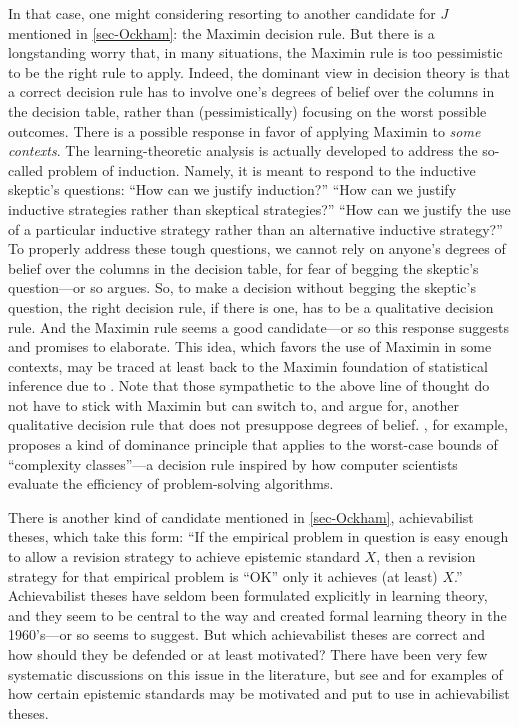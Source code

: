 In that case, one might considering resorting to another candidate for $J$ mentioned in \autoref{sec-Ockham}: the Maximin decision rule. But there is a longstanding worry that, in many situations, the Maximin rule is too pessimistic to be the right rule to apply. Indeed, the dominant view in decision theory is that a correct decision rule has to involve one's degrees of belief over the columns in the decision table, rather than (pessimistically) focusing on the worst possible outcomes. There is a possible response in favor of applying Maximin to {\em some contexts}. The learning-theoretic analysis is actually developed to address the so-called problem of induction. Namely, it is meant to respond to the inductive skeptic's questions: ``How can we justify induction?'' ``How can we justify inductive strategies rather than skeptical strategies?'' ``How can we justify the use of a particular inductive strategy rather than an alternative inductive strategy?'' To properly address these tough questions, we cannot rely on anyone's degrees of belief over the columns in the decision table, for fear of begging the skeptic's question---or so \citet{lange2002okasha} argues. So, to make a decision without begging the skeptic's question, the right decision rule, if there is one, has to be a qualitative decision rule. And the Maximin rule seems a good candidate---or so this response suggests and promises to elaborate. This idea, which favors the use of Maximin in some contexts, may be traced at least back to the Maximin foundation of statistical inference due to \citet{wald1950statistical}. Note that those sympathetic to the above line of thought do not have to stick with Maximin but can switch to, and argue for, another qualitative decision rule that does not presuppose degrees of belief. \citet{kelly2007simplicity}, for example, proposes a kind of dominance principle that applies to the worst-case bounds of ``complexity classes''---a decision rule inspired by how computer scientists evaluate the efficiency of problem-solving algorithms.

There is another kind of candidate mentioned in \autoref{sec-Ockham}, achievabilist theses, which take this form: ``If the empirical problem in question is easy enough to allow a revision strategy to achieve epistemic standard $X$, then a revision strategy for that empirical problem is ``OK'' only it achieves (at least) $X$.'' Achievabilist theses have seldom been formulated explicitly in learning theory, and they seem to be central to the way \citet{putnam1965trial} and \cite{gold1967language} created formal learning theory in the 1960's---or so \citet{kelly1996logic} seems to suggest. But which achievabilist theses are correct and how should they be defended or at least motivated? There have been very few systematic discussions on this issue in the literature, but see \citet{kelly2016realism} and \citet{genin2015theory} for examples of how certain epistemic standards may be motivated and put to use in achievabilist theses. 

